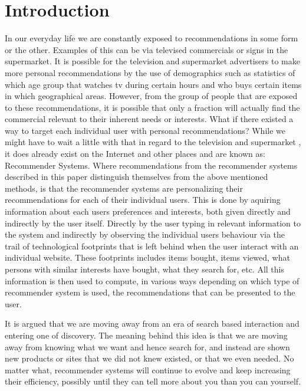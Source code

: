 \section{Introduction}
In our everyday life we are constantly exposed to recommendations in some form or the other. Examples of this can be via televised commercials or signs in the supermarket.
It is possible for the television and supermarket advertisers to make more personal recommendations by the use of demographics such as statistics of which age group that watches tv during certain hours and who buys certain items in which geographical areas. However, from the group of people that are exposed to these recommendations, it is possible that only a fraction will actually find the commercial relevant to their inherent needs or interests. What if there existed a way to target each individual user with personal recommendations? While we might have to wait a little with that in regard to the television and supermarket , it does already exist on the Internet and other places and are known as: Recommender Systems.\newline
Where recommendations from the recommender systems described in this paper distinguish themselves from the above mentioned methods, is that the recommender systems are personalizing their recommendations for each of their individual users. This is done by aquiring information about each users preferences and interests, both given directly and indirectly by the user itself. Directly by the user typing in relevant information to the system and indirectly by observing the individual users behaviour via the trail of technological footprints that is left behind when the user interact with an individual website. These footprints includes items bought, items viewed, what persons with similar interests have bought, what they search for, etc. All this information is then used to compute, in various ways depending on which type of recommender system is used, the recommendations that can be presented to the user.

It is argued that we are moving away from an era of search based interaction and entering one of discovery. The meaning  behind this idea is that we are moving away from knowing what we want and hence search for, and instead are shown new products or sites that we did not knew existed, or that we even needed. No matter what, recommender systems will continue to evolve and keep increasing their efficiency, possibly until they can tell more about you than you can yourself.


